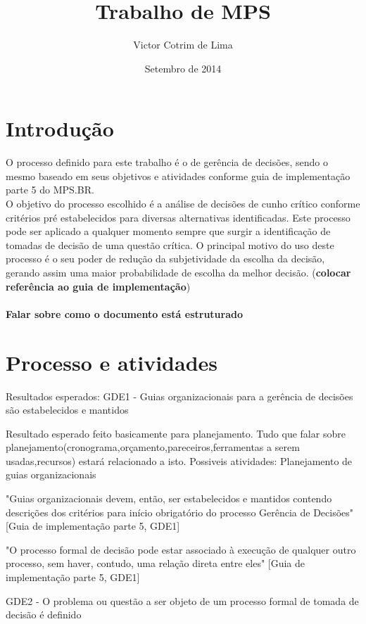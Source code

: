 \documentclass{article}
\title{Trabalho de MPS}
\author{Victor Cotrim de Lima }
\date{Setembro de 2014}
\begin{document}
\maketitle


\section{Introdução}
O processo definido para este trabalho é o de gerência de decisões, sendo o mesmo baseado em seus objetivos e atividades conforme guia de implementação parte 5 do MPS.BR.\\
O objetivo do processo escolhido é a análise de decisões de cunho crítico conforme critérios pré estabelecidos para diversas alternativas identificadas. Este processo pode ser aplicado a qualquer momento sempre que surgir a identificação de tomadas de decisão de uma questão crítica. O principal motivo do uso deste processo é o seu poder de redução da subjetividade da escolha da decisão, gerando assim uma maior probabilidade de escolha da melhor decisão. (\textbf{colocar referência ao guia de implementação})
\paragraph{Falar sobre como o documento está estruturado}

\section{Processo e atividades} 


	Resultados esperados:
	GDE1 - Guias organizacionais para a gerência de decisões são estabelecidos e mantidos
	
		Resultado esperado feito basicamente para planejamento. Tudo que falar sobre planejamento(cronograma,orçamento,pareceiros,ferramentas a serem usadas,recursos) estará relacionado a isto.
		Possiveis atividades:
			Planejamento de guias organizacionais
										
	"Guias organizacionais devem, então, ser estabelecidos e mantidos contendo descrições dos critérios para início obrigatório do processo Gerência de Decisões"[Guia de implementação parte 5, GDE1]
				
	"O processo formal de decisão pode estar associado à execução de qualquer outro processo, sem haver, contudo, uma relação direta entre eles" [Guia de implementação parte 5, GDE1]
	

	GDE2 - O problema ou questão a ser objeto de um processo formal de tomada de decisão é definido
		
\end{document}

